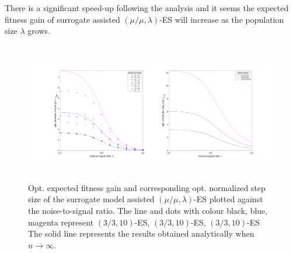 There is a significant speed-up following the analysis and it seems the expected fitness gain of surrogate assisted $(\mu/\mu,\lambda)$-ES will increase as the population size $\lambda$ grows.




\begin{center}
\begin{figure}
\includegraphics[height=2.4in, width=6in]{opt_stepSize_fitGain_v2}
\caption{Opt. expected fitness gain and corresponding opt. normalized step size of the surrogate model assisted $(\mu/\mu,\lambda)$-ES plotted against the noise-to-signal ratio. The line and dots with colour black, blue, magenta represent $(3/3,10)$-ES, $(3/3,10)$-ES, $(3/3,10)$-ES The solid line represents the results obtained analytically when $n\rightarrow \infty$. }
\label{fig:opt_stepSize_fitGain}
\end{figure}
\end{center}





